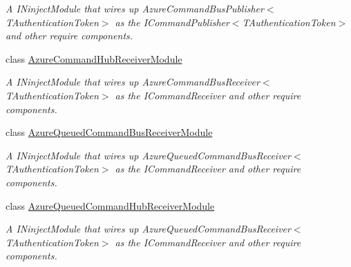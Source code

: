 \begin{DoxyCompactItemize}
\begin{DoxyCompactList}\small\item\em A I\+Ninject\+Module that wires up Azure\+Command\+Bus\+Publisher$<$\+T\+Authentication\+Token$>$ as the I\+Command\+Publisher$<$\+T\+Authentication\+Token$>$ and other require components. \end{DoxyCompactList}\item 
class \hyperlink{classCqrs_1_1Azure_1_1EventHub_1_1CommandBus_1_1Configuration_1_1AzureCommandHubReceiverModule}{Azure\+Command\+Hub\+Receiver\+Module}
\begin{DoxyCompactList}\small\item\em A I\+Ninject\+Module that wires up Azure\+Command\+Bus\+Receiver$<$\+T\+Authentication\+Token$>$ as the I\+Command\+Receiver and other require components. \end{DoxyCompactList}\item 
class \hyperlink{classCqrs_1_1Azure_1_1EventHub_1_1CommandBus_1_1Configuration_1_1AzureQueuedCommandBusReceiverModule}{Azure\+Queued\+Command\+Bus\+Receiver\+Module}
\begin{DoxyCompactList}\small\item\em A I\+Ninject\+Module that wires up Azure\+Queued\+Command\+Bus\+Receiver$<$\+T\+Authentication\+Token$>$ as the I\+Command\+Receiver and other require components. \end{DoxyCompactList}\item 
class \hyperlink{classCqrs_1_1Azure_1_1EventHub_1_1CommandBus_1_1Configuration_1_1AzureQueuedCommandHubReceiverModule}{Azure\+Queued\+Command\+Hub\+Receiver\+Module}
\begin{DoxyCompactList}\small\item\em A I\+Ninject\+Module that wires up Azure\+Queued\+Command\+Bus\+Receiver$<$\+T\+Authentication\+Token$>$ as the I\+Command\+Receiver and other require components. \end{DoxyCompactList}\end{DoxyCompactItemize}
